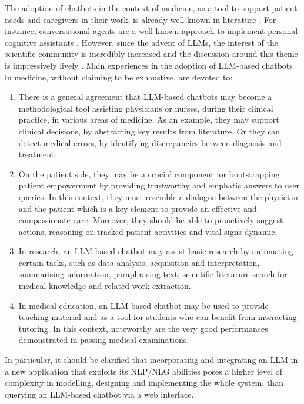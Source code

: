 The adoption of chatbots in the context of medicine, as a tool to support patient needs and caregivers in their work, is already well known in literature \cite{3419368}. 
%
For instance, conversational agents are a well known approach to implement personal cognitive assistants \cite{Sulis2023}.
%
However, since the advent of LLMs, the interest of the scientific community is incredibly increased and the discussion around this theme is impressively lively \cite{Thirunavukarasu2023,Clusmann2023,Tian2023,cascella2024}.
% 
Main experiences in the adoption of LLM-based chatbots in medicine, without claiming to be exhaustive, are devoted to:
%
\begin{enumerate}
    \item There is a general agreement that LLM-based chatbots may become a methodological tool assisting physicians or nurses, during their clinical practice, in various areas of medicine. 
    As an example, they may support clinical decisions, by abstracting key results from literature. Or they can detect medical errors, by identifying discrepancies between diagnosis and treatment.

    \item On the patient side, they may be a crucial component for bootstrapping patient empowerment by providing trustworthy and emphatic answers to user queries. In this context, they must resemble a dialogue between the physician and the patient which is a key element to provide an effective and compassionate care. Moreover, they should be able to proactively suggest actions, reasoning on tracked patient activities and vital signs dynamic.

    \item In research, an LLM-based chatbot may assist basic research by automating certain tasks, such as data analysis, acquisition and interpretation, summarising information, paraphrasing text, scientific literature search for medical knowledge and related work extraction.

    \item In medical education, an LLM-based chatbot may be used to provide teaching material and as a tool for students who can benefit from interacting tutoring. In this context, noteworthy are the very good performances demonstrated in passing medical examinations. 

\end{enumerate}
%
\noindent In particular, it should be clarified that incorporating and integrating an LLM in a new application that exploits its NLP/NLG abilities poses a higher level of complexity in modelling, designing and implementing the whole system, than querying an LLM-based chatbot via a web interface.
